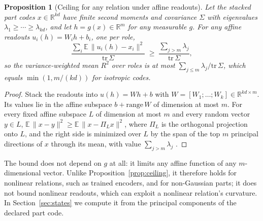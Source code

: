 \documentclass[10pt]{article}
\theoremstyle{plain}
\newtheorem{proposition}{Proposition}
\theoremstyle{remark}
\newcommand{\R}{\mathbb{R}}
\begin{document}
\begin{proposition}[Ceiling for any relation under affine readouts]
\label{prop:ey}
Let the stacked part codes $x \in \R^{kd}$ have finite second moments and covariance $\Sigma$ with eigenvalues $\lambda_1 \ge \cdots \ge \lambda_{kd}$, and let $h = g(x) \in \R^m$ for any measurable $g$. For any affine readouts $u_i(h) = W_i h + b_i$, one per role,
\begin{equation}
  \frac{\sum_i \mathbb{E}\,\lVert u_i(h) - x_i \rVert^2}{\mathrm{tr}\,\Sigma} \;\ge\; \frac{\sum_{j > m} \lambda_j}{\mathrm{tr}\,\Sigma},
\end{equation}
so the variance-weighted mean $R^2$ over roles is at most $\sum_{j \le m} \lambda_j / \mathrm{tr}\,\Sigma$, which equals $\min(1, m/(kd))$ for isotropic codes.
\end{proposition}

\begin{proof}
Stack the readouts into $u(h) = Wh + b$ with $W = [W_1; \ldots; W_k] \in \R^{kd \times m}$. Its values lie in the affine subspace $b + \mathrm{range}\,W$ of dimension at most $m$. For every fixed affine subspace $L$ of dimension at most $m$ and every random vector $y \in L$, $\mathbb{E}\,\lVert x - y \rVert^2 \ge \mathbb{E}\,\lVert x - \Pi_L x \rVert^2$, where $\Pi_L$ is the orthogonal projection onto $L$, and the right side is minimized over $L$ by the span of the top $m$ principal directions of $x$ through its mean, with value $\sum_{j > m} \lambda_j$ \citep{eckart1936}.
\end{proof}

\noindent
The bound does not depend on $g$ at all: it limits any affine function of any $m$-dimensional vector. Unlike Proposition~\ref{prop:ceiling}, it therefore holds for nonlinear relations, such as trained encoders, and for non-Gaussian parts; it does not bound nonlinear readouts, which can exploit a nonlinear relation's curvature. In Section~\ref{sec:states} we compute it from the principal components of the declared part code.
\end{document}
